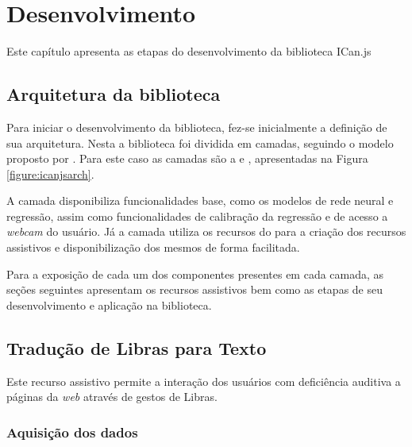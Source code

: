 \newpage
\chapter{Desenvolvimento}
\label{ch:desenvolvimento}

\par Este capítulo apresenta as etapas do desenvolvimento da biblioteca ICan.js

\section{Arquitetura da biblioteca}

\par Para iniciar o desenvolvimento da biblioteca, fez-se inicialmente a definição de sua arquitetura. Nesta a biblioteca foi dividida em camadas, seguindo o modelo proposto por . Para este caso as camadas são a  e , apresentadas na Figura \ref{figure:icanjsarch}.


\par A camada  disponibiliza funcionalidades base, como os modelos de rede neural e regressão, assim como funcionalidades de calibração da regressão e de acesso a \textit{webcam} do usuário. Já a camada  utiliza os recursos do  para a criação dos recursos assistivos e disponibilização dos mesmos de forma facilitada.

\par Para a exposição de cada um dos componentes presentes em cada camada, as seções seguintes apresentam os recursos assistivos bem como as etapas de seu desenvolvimento e aplicação na biblioteca.

\section{Tradução de Libras para Texto}

\par Este recurso assistivo permite a interação dos usuários com deficiência auditiva a páginas da \textit{web} através de gestos de Libras. 

\subsection{Aquisição dos dados}

